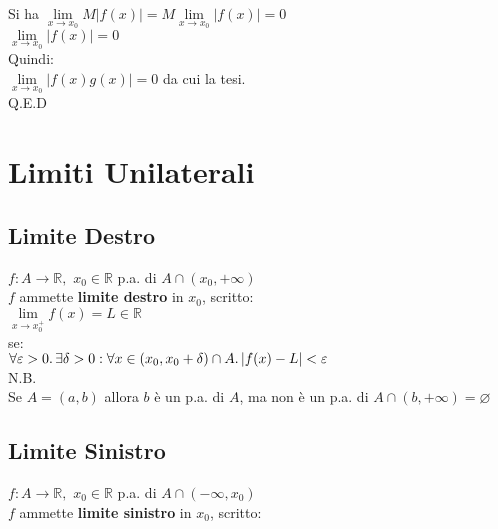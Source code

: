 \documentclass[a4paper, twoside, italian, 11pt]{book}
\newcommand{\abs}[1] {\left | #1 \right |}
\newcommand{\R}{\mathbb{R}}
\let\emptyset\varnothing
\begin{document}
\noindent
Si ha $\lim\limits_{x \to x_0} M \abs{f(x)} = M \lim\limits_{x \to x_0} \abs{f(x)} = 0$ \\

\noindent
$\lim\limits_{x \to x_0} \abs{f(x)} = 0$ \\

\noindent
Quindi: \\

$\lim\limits_{x \to x_0} \abs{f(x)g(x)} = 0$ da cui la tesi. \\

\noindent
Q.E.D



\section{Limiti Unilaterali}


\subsection{Limite Destro}

\noindent
$f : A \rightarrow \R,$ $x_0 \in \R$ p.a. di $A \cap (x_0, +\infty)$ \\

\noindent
$f$ ammette \textbf{limite destro} in $x_0$, scritto: \\

$\lim\limits_{x \to x_0^+} f(x) = L \in \R$ \\

\noindent
se: \\

$\forall \varepsilon > 0 \ldotp \exists \delta > 0 : \forall x \in (x_0, x_0 + \delta) \cap A \ldotp \abs{f(x) - L} < \varepsilon$ \\

\noindent
N.B. \\

\noindent
Se $A = (a, b)$ allora $b$ è un p.a. di $A$, ma non è un p.a. di $A \cap (b, +\infty) = \emptyset$


\subsection{Limite Sinistro}

\noindent
$f : A \rightarrow \R,$ $x_0 \in \R$ p.a. di $A \cap (-\infty, x_0)$ \\

\noindent
$f$ ammette \textbf{limite sinistro} in $x_0$, scritto: \\
\end{document}
